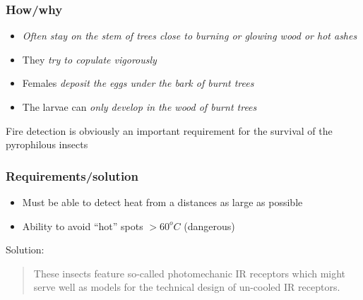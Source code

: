 \documentclass[14pt]{beamer}
\begin{document}
\begin{frame}
\frametitle{How/why}
\begin{itemize}
\item \emph{Often stay on the stem of trees close to burning or glowing wood or hot ashes}
\item They \emph{try to copulate vigorously}
\item Females \emph{deposit the eggs under the bark of burnt trees}
\item The larvae can \emph{only develop in the wood of burnt trees}
\end{itemize}
Fire detection is obviously an important requirement for the survival of the pyrophilous insects
\end{frame}

\begin{frame}
\frametitle{Requirements/solution}
\begin{itemize}
\item Must be able to detect heat from a distances as large as possible
\item Ability to avoid ``hot'' spots $>60^oC$ (dangerous)
\end{itemize}
\pause
Solution:\\
\begin{quote}
\alert{These insects feature so-called photomechanic IR receptors} which might serve well as models for the technical design of un-cooled IR receptors.
\end{quote}
\end{frame}
\end{document}
